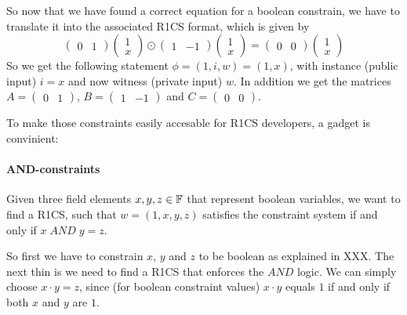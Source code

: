 So now that we have found a correct equation for a boolean constrain, we have to translate it into the associated R1CS format, which is given by 
$$
\begin{pmatrix}0 & 1 \end{pmatrix} \begin{pmatrix} 1 \\ x \end{pmatrix}\odot
\begin{pmatrix}1 & -1 \end{pmatrix} \begin{pmatrix} 1 \\ x \end{pmatrix} =
\begin{pmatrix}0 & 0 \end{pmatrix} \begin{pmatrix} 1 \\ x \end{pmatrix}
$$
So we get the following statement $\phi = (1,i,w) = (1, x)$, with instance (public input) $i=x$ and now witness (private input) $w$. In addition we get the matrices
$A=\begin{pmatrix}0 & 1\end{pmatrix}$, $B=\begin{pmatrix}1 & -1\end{pmatrix}$ and $C=\begin{pmatrix}0 & 0\end{pmatrix}$.

To make those constraints easily accesable for R1CS developers, a gadget is convinient:

   

\paragraph{AND-constraints} Given three field elements $x,y,z\in\mathbb{F}$ that represent boolean variables, we want to find a R1CS, such that $w=(1,x,y,z)$ satisfies the constraint system if and only if $x\; AND \; y =z$. 

So first we have to constrain $x$, $y$ and $z$ to be boolean as explained in XXX. The next thin is we need to find a R1CS that enforces the $AND$ logic. We can simply choose $x\cdot y =z$, since (for boolean constraint values) $x\cdot y$ equals $1$ if and only if both $x$ and $y$ are $1$.  

